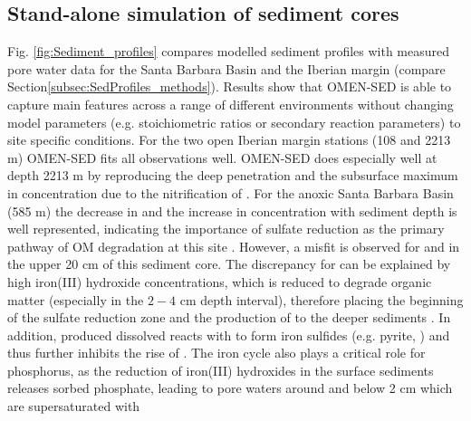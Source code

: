 \documentclass[gmd, manuscript]{copernicus}
\begin{document}
\subsection{Stand-alone simulation of sediment cores}\label{subsec:SedProfiles}
Fig. \ref{fig:Sediment_profiles} compares modelled sediment profiles with measured pore water data for the Santa Barbara Basin and the Iberian margin (compare Section\ref{subsec:SedProfiles_methods}). Results show 
that OMEN-SED is able to capture main features across a range of different environments without changing model parameters (e.g. stoichiometric ratios or secondary reaction parameters) to site specific conditions. 
For the two open Iberian margin stations (108 and 2213 m) OMEN-SED fits all observations well. OMEN-SED does especially well at depth 2213 m by reproducing the deep  penetration and the subsurface maximum in  
concentration due to the nitrification of . For the anoxic Santa Barbara Basin (585 m) the decrease in  and the increase in  concentration with sediment depth is well represented, indicating the 
importance of sulfate reduction as the primary pathway of OM degradation at this site \citep[compare][]{meysman_reactive_2003}. 
However, a misfit is observed for  and  in the upper 20 cm of this sediment core. The discrepancy for  can be explained by high iron(III) hydroxide concentrations, 
which is reduced to degrade organic matter (especially in the $2-4$ cm depth interval), therefore placing the beginning of the sulfate reduction zone and the production of  to the deeper sediments \citep{reimers_porewater_1996}. 
In addition, produced dissolved  reacts with  to form iron sulfides (e.g. pyrite, ) and thus further inhibits the rise of  \citep{reimers_seasonal_1990}. 
The iron cycle also plays a critical role for phosphorus, as the reduction of iron(III) hydroxides in the surface sediments releases sorbed phosphate, leading to pore waters around and below 2 cm which are supersaturated with 
\end{document}

